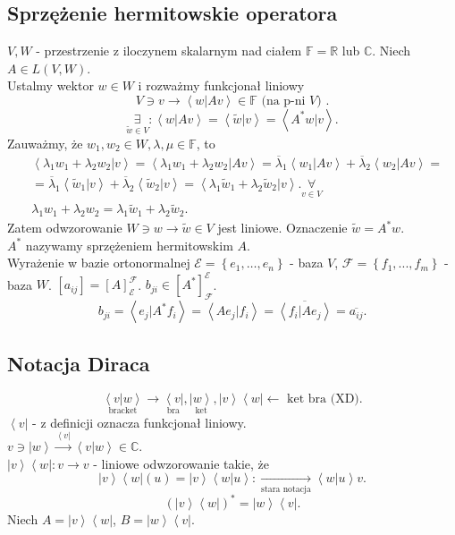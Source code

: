 \documentclass[../main.tex]{subfiles}
\begin{document}
\subsection{Sprzężenie hermitowskie operatora}
$V,W$ - przestrzenie z iloczynem skalarnym nad ciałem $\mathbb{F} = \mathbb{R}$ lub $\mathbb{C}$. Niech $A\in L(V,W)$.\\
Ustalmy wektor $w\in W$ i rozważmy funkcjonał liniowy
\[
    V \ni v \to \left<w|Av \right> \in \mathbb{F} \text{ (na p-ni $V$) }
.\]
\[
\underset{\tilde w\in V}{\exists} : \left<w|Av \right> = \left<\tilde w|v \right> = \left<A^* w | v \right>
.\]
Zauważmy, że $w_1,w_2\in W, \lambda,\mu \in \mathbb{F}$, to
\begin{align*}
    &\left< \lambda_1w_1+\lambda_2w_2|v\right> = \left<\lambda_1w_1+\lambda_2w_2 | Av \right> = \overline{\lambda}_1 \left<w_1|Av \right> + \overline{\lambda}_2 \left<w_2|Av \right> =\\
    &=\overline{\lambda}_1 \left<\tilde w_1|v \right> + \overline{\lambda}_2 \left<\tilde w_2|v \right> = \left<\lambda_1\tilde w_1 + \lambda_2\tilde w_2|v \right>. \underset{v\in V}{\forall}\\
    &\lambda_1w_1 + \lambda_2w_2 = \lambda_1\tilde w_1 + \lambda_2\tilde w_2
.\end{align*}
Zatem odwzorowanie $W\ni w \to \tilde w\in V$ jest liniowe. Oznaczenie $\tilde w = A^* w$.\\
$A^*$ nazywamy sprzężeniem hermitowskim $A$.\\
Wyrażenie w bazie ortonormalnej $\mathcal{E} = \left\{ e_1,\ldots,e_n \right\} $ - baza $V$, $\mathcal{F} = \left\{ f_1,...,f_m \right\} $ - baza $W$. $[a_{ij}] = [A]_\mathcal{E}^\mathcal{F}$. $b_{ji}\in [A^*]_\mathcal{F}^\mathcal{E}$.
\[
    b_{ji} = \left<e_j | A^*f_i \right> = \left<A e_j | f_i \right> = \overline{\left<f_i|A e_j \right>} = \overline{a_{ij}}
.\]
\subsection{Notacja Diraca}
\[
    \underset{\text{bracket}}{\left<v|w \right>} \to \underset{\text{bra}}{\left< v \right|}, \underset{\text{ket}}{\left| w \right>}, \left|v\right>\left<w\right| \leftarrow \text{ ket bra (XD)}
.\]
$\left<v \right|$ - z definicji oznacza funkcjonał liniowy.\\
$v \ni \left|w \right> \overset{\left<v \right|}{\to} \left<v|w \right>\in \mathbb{C} $.\\
$\left|v \right>\left<w \right|: v\to v$ - liniowe odwzorowanie takie, że
\[
    \left|v \right>\left<w \right|(u) = \left|v \right>\left<w|u \right>: \underset{\text{stara notacja}}{\to} \left<w|u \right> v
.\]
\[
    \left( \left|v \right>\left< w\right| \right) ^* = \left|w \right>\left<v \right|
.\]
Niech $A = \left|v \right>\left<w \right|$, $B = \left|w \right>\left<v \right|$.
\end{document}
